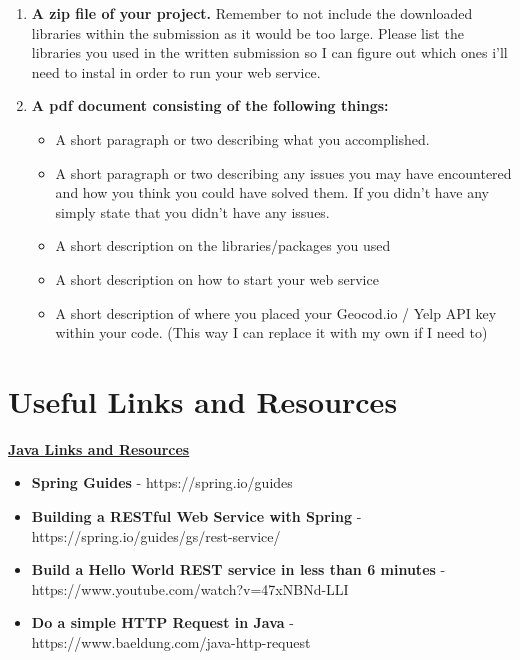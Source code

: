 \documentclass{article}
\begin{document}
\begin{enumerate}
\item \textbf{A zip file of your project.} Remember to not include the downloaded libraries within the submission as it would be too large. Please list the libraries you used in the written submission so I can figure out which ones i'll need to instal in order to run your web service.
\item \textbf{A pdf document consisting of the following things:}
	\begin{itemize}
	\item A short paragraph or two describing what you accomplished.
	\item A short paragraph or two describing any issues you may have encountered and how you think you could have solved them. If you didn't have any simply state that you didn't have any issues.
	\item A short description on the libraries/packages you used
	\item A short description on how to start your web service
	\item A short description of where you placed your Geocod.io / Yelp API key within your code. (This way I can replace it with my own if I need to)
	\end{itemize}
\end{enumerate}




\section*{Useful Links and Resources} %

\textbf{\underline{Java Links and Resources}}
	\begin{itemize} 
	\item \textbf{Spring Guides} - https://spring.io/guides
	\item \textbf{Building a RESTful Web Service with Spring} - https://spring.io/guides/gs/rest-service/
	\item \textbf{Build a Hello World REST service in less than 6 minutes} - \\ https://www.youtube.com/watch?v=47xNBNd-LLI
	\item \textbf{Do a simple HTTP Request in Java} - \\ https://www.baeldung.com/java-http-request
\end{itemize}
\end{document}

